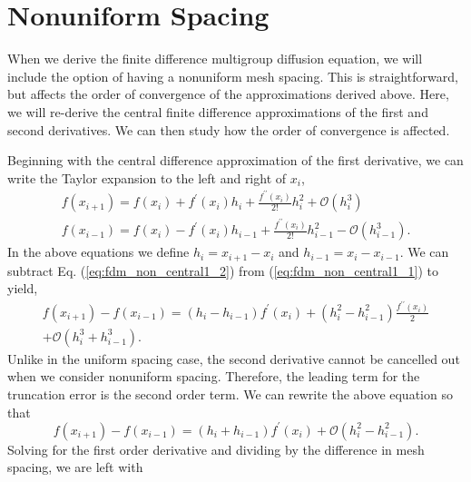 \section{Nonuniform Spacing}
\label{subsec:fdm_nonuniform}

When we derive the finite difference multigroup diffusion equation, we will include the option of having a nonuniform
mesh spacing.  This is straightforward, but affects the order of convergence of the approximations derived above.  Here,
we will re-derive the central finite difference approximations of the first and second derivatives.  We can then study how
the order of convergence is affected.
\par
Beginning with the central difference approximation of the first derivative, we can write the Taylor expansion to the left and
right of $x_i$,
\begin{eqnarray}
    f\left(x_{i+1}\right) = f\left(x_{i}\right) + f^{\prime}\left(x_{i}\right)h_{i} + \frac{f^{\prime\prime}\left(x_{i}\right)}{2!}h^{2}_{i} + \mathcal{O}\left(h^{3}_{i}\right) \\
  \label{eq:fdm_non_central1_1}
    f\left(x_{i-1}\right) = f\left(x_{i}\right) - f^{\prime}\left(x_{i}\right)h_{i-1} + \frac{f^{\prime\prime}\left(x_{i}\right)}     {2!}h^{2}_{i-1} - \mathcal{O}\left(h^{3}_{i-1}\right).
  \label{eq:fdm_non_central1_2}
\end{eqnarray}
In the above equations we define $h_{i} = x_{i+1} - x_{i}$ and $h_{i-1} = x_{i} - x_{i-1}$.  We can subtract Eq. 
(\ref{eq:fdm_non_central1_2}) from (\ref{eq:fdm_non_central1_1}) to yield,
\begin{eqnarray}
     f\left(x_{i+1}\right) -  f\left(x_{i-1}\right) = \left(h_{i} - h_{i-1}\right) f^{\prime}\left(x_{i}\right) + 
     \left(h^{2}_{i} - h^{2}_{i-1}\right)\frac{f^{\prime\prime}\left(x_{i}\right)}{2} \\ + \mathcal{O}\left(h^{3}_{i} +
      h^{3}_{i-1}\right). \nonumber
\end{eqnarray}
Unlike in the uniform spacing case, the second derivative cannot be cancelled out when we consider nonuniform spacing.
Therefore, the leading term for the truncation error is the second order term. We can rewrite the above equation so 
that
\begin{equation}
     f\left(x_{i+1}\right) -  f\left(x_{i-1}\right) = \left(h_{i} + h_{i-1}\right) f^{\prime}\left(x_{i}\right) + 
      \mathcal{O}\left(h^{2}_{i} - h^{2}_{i-1}\right).
\end{equation}
Solving for the first order derivative and dividing by the difference in mesh spacing, we are left with
